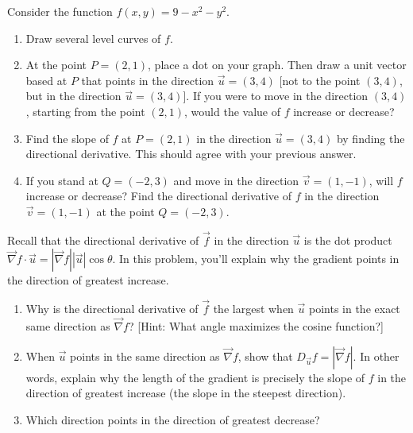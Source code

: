 \begin{problem}%
 Consider the function $f(x,y) = 9-x^2-y^2$.
 \begin{enumerate}
  \item Draw several level curves of $f$. 
  \item At the point $P=(2,1)$, place a dot on your graph. Then draw a unit vector based at $P$ that points in the direction $\vec u=(3,4)$ [not to the point $(3,4)$, but in the direction $\vec u=(3,4)$]. If you were to move in the direction $(3,4)$, starting from the point $(2,1)$, would the value of $f$ increase or decrease?
  \item Find the slope of $f$ at $P=(2,1)$ in the direction $\vec u=(3,4)$ by finding the directional derivative. This should agree with your previous answer.
  \item If you stand at $Q=(-2,3)$ and move in the direction $\vec v= (1,-1)$, will $f$ increase or decrease?  Find the directional derivative of $f$ in the direction $\vec v=(1,-1)$ at the point $Q=(-2,3)$.
 \end{enumerate}
\end{problem}

\begin{problem}
Recall that the directional derivative of $\vec f$ in the direction $\vec u$ is the dot product 
$\vec \nabla f\cdot \vec u 
= |\vec \nabla f| |\vec u|\cos\theta$. 
In this problem, you'll explain why the gradient points in the direction of greatest increase.
\begin{enumerate}
 \item Why is the directional derivative of $\vec f$ the largest when $\vec u$ points in the exact same direction as $\vec \nabla f$? [Hint: What angle maximizes the cosine function?]
 \item When $\vec u$ points in the same direction as $\vec \nabla f$, show that $D_{\vec u}f = |\vec \nabla f|$. In other words, explain why the length of the gradient is precisely the slope of $f$ in the direction of greatest increase (the slope in the steepest direction).
 \item Which direction points in the direction of greatest decrease?
\end{enumerate}
\end{problem}

